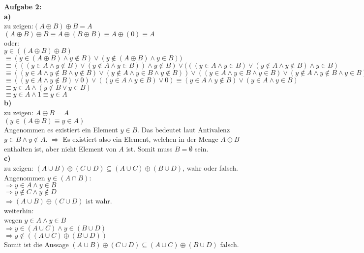 \documentclass[a4paper]{scrartcl}
\begin{document}
	\begin{flushleft}
		\textbf{Aufgabe 2:}\\
		\textbf{a)}\\
		zu zeigen:$(A\oplus B)\oplus B = A$ \\[1em]
		$(A\oplus B)\oplus B \equiv A\oplus (B\oplus B) \equiv A\oplus (0)\equiv A$\\[1em]
		oder:\\
		$y\in ((A \oplus B)\oplus B)$\\
		$\equiv (y\in(A\oplus B)\wedge y\notin B) \vee(y\notin(A\oplus B)\wedge y\in B))$\\
		$\equiv (((y\in A \wedge y\notin B)\vee(y\notin A\wedge y\in B))\wedge y\notin B)\vee(((y\in A\wedge y\in B)\vee(y\notin A\wedge y\notin B)\wedge y\in B)$\\
		$\equiv ((y\in A\wedge y\notin B\wedge y\notin B)\vee(y\notin A\wedge y\in B\wedge y\notin B))\vee((y\in A\wedge y\in B \wedge y\in B)\vee(y\notin A\wedge y\notin B\wedge y\in B))$\\
		$\equiv ((y\in A\wedge y\notin B)\vee 0)\vee((y\in A \wedge y\in B)\vee 0)\equiv (y\in A\wedge y\notin B)\vee(y\in A\wedge y\in B)$\\
		$\equiv y\in A\wedge(y\notin B\vee y\in B)$\\
		$\equiv y\in A\wedge 1\equiv y\in A$\\[1em]
		\textbf{b)}\\
		zu zeigen: $A\oplus B = A$\\[1em]
		$(y\in (A\oplus B) \equiv y\in A)$\\
		Angenommen es existiert ein Element $y \in B$. Das bedeutet laut Antivalenz $y \in B \wedge y\notin A$. $\Rightarrow$ Es existiert also ein Element, welchen in der Menge $A\oplus B$ enthalten ist, aber nicht Element von $A$ ist. Somit muss $B = \emptyset$ sein.\\[1em]
		\textbf{c)}\\
		zu zeigen: $(A\cup B)\oplus(C\cup D)\subseteq(A\cup C)\oplus(B\cup D)$, wahr oder falsch.\\[1em]
		Angenommen $y\in (A\cap B)$:\\
		$\Rightarrow y\in A \wedge y\in B$\\
		$\Rightarrow y\notin C \wedge y \notin D$\\
		$\Rightarrow (A\cup B)\oplus(C\cup D)$ ist wahr.\\
		weiterhin:\\
		wegen $y\in A \wedge y\in B$\\
		$\Rightarrow y\in (A\cup C) \wedge y\in(B\cup D)$\\
		$\Rightarrow y\notin ((A\cup C)\oplus(B\cup D))$\\
		Somit ist die Aussage $(A\cup B)\oplus(C\cup D)\subseteq(A\cup C)\oplus(B\cup D)$ falsch.
	\end{flushleft}
\end{document}
